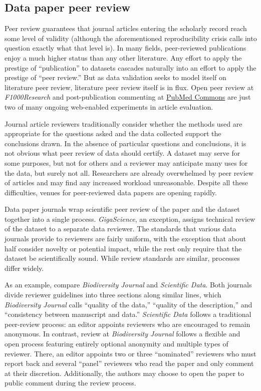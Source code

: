 \documentclass[10pt,a4paper,twocolumn]{article}
\begin{document}
{\subsection*{Data paper peer review}\label{data-paper-peer-review}

Peer review guarantees that journal articles entering the scholarly record reach some level of validity (although the aforementioned reproducibility crisis calls into question exactly what that level is).
In many fields, peer-reviewed publications enjoy a much higher status than any other literature.
Any effort to apply the prestige of ``publication'' to datasets cascades naturally into an effort to apply the prestige of ``peer review.''
But as data validation seeks to model itself on literature peer review, literature peer review itself is in flux\cite{pulverer_transparent_2010, herron_is_2012, kriegeskorte_emerging_2012}.
Open peer review at \emph{F1000Research} and post-publication commenting at \href{http://www.ncbi.nlm.nih.gov/pubmedcommons/}{PubMed Commons} are just two of many ongoing web-enabled experiments in article evaluation.

Journal article reviewers traditionally consider whether the methods used are appropriate for the questions asked and the data collected support the conclusions drawn.
In the absence of particular questions and conclusions, it is not obvious what peer review of data should certify.
A dataset may serve for some purposes, but not for others and a reviewer may anticipate many uses for the data, but surely not all\cite{parsons_data_2010}.
Researchers are already overwhelmed by peer review of articles\cite{diederich_are_2013} and may find any increased workload unreasonable.
Despite all these difficulties, venues for peer-reviewed data papers are opening rapidly.

Data paper journals wrap scientific peer review of the paper and the dataset together into a single process. 
\emph{GigaScience}, an exception, assigns technical review of the dataset to a separate data reviewer.
The standards that various data journals provide to reviewers are fairly uniform, with the exception that about half consider novelty or potential impact, while the rest only require that the dataset be scientifically sound.
While review standards are similar, processes differ widely. 

As an example, compare \emph{Biodiversity Journal} and \emph{Scientific Data}.
Both journals divide reviewer guidelines into three sections along similar lines, which \emph{Biodiversity Journal} calls ``quality of the data,'' ``quality of the description,'' and ``consistency between manuscript and data.''
\emph{Scientific Data} follows a traditional peer-review process: an editor appoints reviewers who are encouraged to remain anonymous.
In contrast, review at \emph{Biodiversity Journal} follows a flexible and open process featuring entirely optional anonymity and multiple types of reviewer.
There, an editor appoints two or three ``nominated'' reviewers who must report back and several ``panel'' reviewers who read the paper and only comment at their discretion.
Additionally, the authors may choose to open the paper to public comment during the review process.

}
\end{document}
